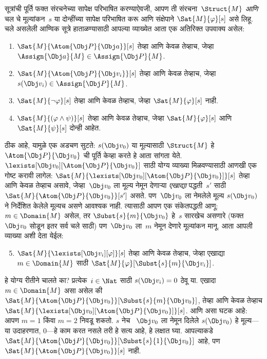 सूत्रांची पूर्ति फक्त संरचनेच्या सापेक्ष परिभाषित
करण्याऐवजी, आपण ती संरचना~$\Struct{M}$ \emph{आणि}
चल चे मूल्यांकन~$s$ या दोन्हींच्या सापेक्ष परिभाषित करू आणि
संक्षेपाने $\Sat{M}{\varphi}[s]$ असे लिहू. चले असलेली आण्विक
सूत्रे हाताळण्यासाठी आपल्या व्याख्येत आता एक अतिरिक्त उपवाक्य
असेल:
\begin{enumerate}
  \item $\Sat{M}{\Atom{\Obj P}{\Obj a}}[s]$ तेव्हा आणि केवळ तेव्हाच,
  जेव्हा $\Assign{\Obj a}{M} \in \Assign{\Obj P}{M}$.
  \item $\Sat{M}{\Atom{\Obj P}{\Obj v_i}}[s]$ तेव्हा आणि केवळ तेव्हाच,
  जेव्हा $s(\Obj v_i) \in \Assign{\Obj P}{M}$.
  \item $\Sat{M}{\lnot \varphi}[s]$ तेव्हा आणि केवळ तेव्हाच, जेव्हा
  $\Sat{M}{\varphi}[s]$ नाही.
  \item $\Sat{M}{(\varphi \land \psi)}[s]$ तेव्हा आणि केवळ तेव्हाच, जेव्हा
  $\Sat{M}{\varphi}[s]$ आणि $\Sat{M}{\psi}[s]$ दोन्ही आहेत.
\end{enumerate}
ठीक आहे, यामुळे एक अडचण सुटते: $s(\Obj v_0)$ या मूल्यासाठी
$\Struct{M}$ हे $\Atom{\Obj P}{\Obj v_0}$ ची पूर्ति केव्हा करते हे आता
सांगता येते. $\lexists[\Obj v_0][\Atom{\Obj P}{\Obj v_0}]$ साठी योग्य
व्याख्या मिळवण्यासाठी आणखी एक गोष्ट करावी लागेल:
$\Sat{M}{\lexists[\Obj v_0][\Atom{\Obj P}{\Obj v_0}]}[s]$ तेव्हा आणि
केवळ तेव्हाच असावे, जेव्हा~$\Obj v_0$ ला मूल्य नेमून देणाऱ्या
\emph{एखाद्या} पद्धती~$s'$ साठी
$\Sat{M}{\Atom{\Obj P}{\Obj v_0}}[s']$ असते. पण~$\Obj v_0$ ला नेमलेले
मूल्य $s(\Obj v_0)$ ने निर्देशित केलेले मूल्यच असणे आवश्यक नाही.
त्यासाठी आपण एक संकेतपद्धती आणू: $m \in \Domain{M}$ असेल, तर
$\Subst{s}{m}{\Obj v_0}$ हे~$s$ सारखेच असणारे (फक्त~$\Obj v_0$ सोडून
इतर सर्व चले साठी) पण~$\Obj v_0$ ला~$m$ नेमून देणारे
मूल्यांकन मानू. आता आपली व्याख्या अशी देता येईल:
\begin{enumerate}\setcounter{enumi}{4}
  \item $\Sat{M}{\lexists[\Obj v_i][\varphi]}[s]$ तेव्हा आणि केवळ तेव्हाच,
  जेव्हा एखाद्या~$m \in \Domain{M}$ साठी
  $\Sat{M}{\varphi}[\Subst{s}{m}{\Obj v_i}]$.
\end{enumerate}
हे योग्य रीतीने चालते का? प्रत्येक~$i \in \Nat$ साठी
$s(\Obj v_i) = 0$ ठेवू या. एखादा $m \in \Domain{M}$ असा असेल की
$\Sat{M}{\Atom{\Obj P}{\Obj v_0}}[\Subst{s}{m}{\Obj v_0}]$, तेव्हा आणि
केवळ तेव्हाच $\Sat{M}{\lexists[\Obj v_0][\Atom{\Obj P}{\Obj v_0}]}[s]$.
आणि असा घटक आहे: आपण $m = 1$ किंवा $m = 2$ निवडू शकतो. $s$ नेच
~$\Obj v_0$ ला नेमून दिलेले $s(\Obj v_0)$ हे मूल्य---या उदाहरणात,
$0$---हे काम करत नसले तरी हे सत्य आहे, हे लक्षात घ्या. आपल्याकडे
$\Sat{M}{\Atom{\Obj P}{\Obj v_0}}[\Subst{s}{1}{\Obj v_0}]$ आहे, पण
$\Sat{M}{\Atom{\Obj P}{\Obj v_0}}[s]$ नाही.


